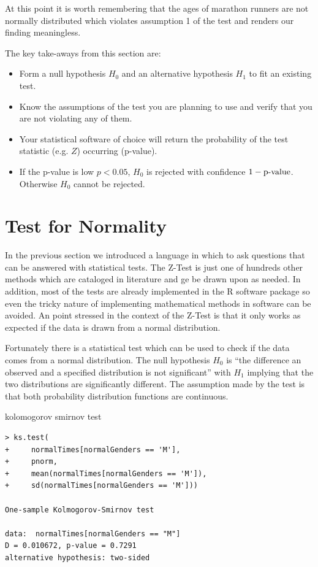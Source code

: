 \documentclass{tufte-book} %
\begin{document}
At this point it is worth remembering that the ages of marathon runners are not normally distributed which violates assumption 1 of the test and renders our finding meaningless.

\begin{tcolorbox}
	The key take-aways from this section are:
	\begin{itemize}
		\item Form a null hypothesis $H_0$ and an alternative hypothesis $H_1$ to fit an existing test.
		\item Know the assumptions of the test you are planning to use and verify that you are not violating any of them.
		\item Your statistical software of choice will return the probability of the test statistic (e.g. $Z$) occurring (p-value).
		\item If the p-value is low $p<0.05$, $H_0$ is rejected with confidence $1 - \hbox{p-value}$. Otherwise $H_0$ cannot be rejected.
	\end{itemize}
\end{tcolorbox}

\section{Test for Normality}
In the previous section we introduced a language in which to ask questions that can be answered with statistical tests. The \hbox{Z-Test} is just one of hundreds other methods which are cataloged in literature\cite{kanji2006} and ge be drawn upon as needed. In addition, most of the tests are already implemented in the R software package so even the tricky nature of implementing mathematical methods in software can be avoided. An point stressed in the context of the \hbox{Z-Test} is that it only works as expected if the data is drawn from a normal distribution. 

Fortunately there is a statistical test which can be used to check if the data comes from a normal distribution. The null hypothesis $H_0$ is ``the difference an observed and a specified distribution is not significant'' with $H_1$ implying that the two distributions are significantly different. The assumption made by the test is that both probability distribution functions are continuous.

 

kolomogorov smirnov test 

\begin{Verbatim}
> ks.test(
+     normalTimes[normalGenders == 'M'], 
+     pnorm, 
+     mean(normalTimes[normalGenders == 'M']), 
+     sd(normalTimes[normalGenders == 'M']))

One-sample Kolmogorov-Smirnov test

data:  normalTimes[normalGenders == "M"]
D = 0.010672, p-value = 0.7291
alternative hypothesis: two-sided
\end{Verbatim}
\end{document}

